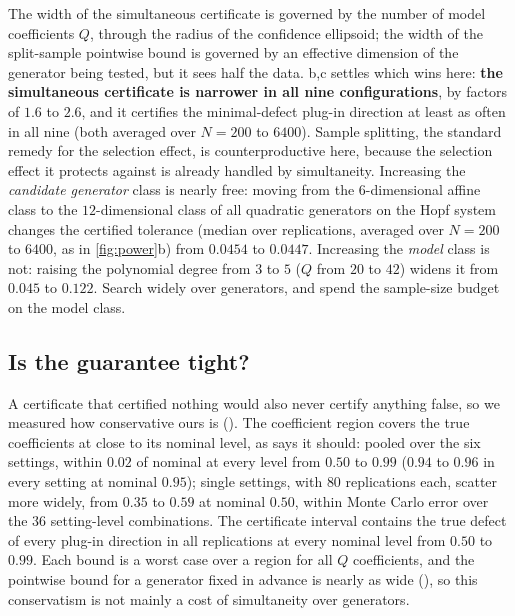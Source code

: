 The width of the simultaneous certificate is governed by the number of model
coefficients $Q$, through the radius of the confidence ellipsoid; the width of
the split-sample pointwise bound is governed by an effective dimension of the
generator being tested, but it sees half the data. b,c
settles which wins here: \textbf{the simultaneous certificate is narrower in all
nine configurations}, by factors of $1.6$ to $2.6$, and it certifies the
minimal-defect plug-in direction at least as often in all nine (both averaged
over $N = 200$ to $6400$). Sample splitting, the standard remedy
for the selection effect, is counterproductive here, because the selection
effect it protects against is already handled by simultaneity. Increasing the
\emph{candidate generator} class is nearly free: moving from the
$6$-dimensional affine class to the $12$-dimensional class of all quadratic
generators on the Hopf system changes the certified tolerance (median over
replications, averaged over $N = 200$ to $6400$, as in \cref{fig:power}b) from
$0.0454$ to $0.0447$. Increasing the \emph{model} class is not: raising the
polynomial degree from $3$ to $5$ ($Q$ from $20$ to $42$) widens it from
$0.045$ to $0.122$. Search widely over generators, and spend the
sample-size budget on the model class.

\subsection{Is the guarantee tight?}
\label{sec:tightness}

A certificate that certified nothing would also never certify anything false,
so we measured how conservative ours is (\SFtightness). The coefficient region
covers the true coefficients at close to its nominal level, as
 says it should: pooled over the six settings, within
$0.02$ of nominal at every level from $0.50$ to $0.99$ ($0.94$ to $0.96$ in
every setting at nominal $0.95$); single settings, with $80$ replications each,
scatter more widely, from $0.35$ to $0.59$ at nominal $0.50$, within Monte
Carlo error over the $36$ setting-level combinations. The certificate interval
contains the true defect of every plug-in direction in all replications at
every nominal level from $0.50$ to $0.99$. Each bound is a worst case over a
region for all $Q$ coefficients, and the pointwise bound for a generator fixed
in advance is nearly as wide (), so this conservatism is
not mainly a cost of simultaneity over generators.

